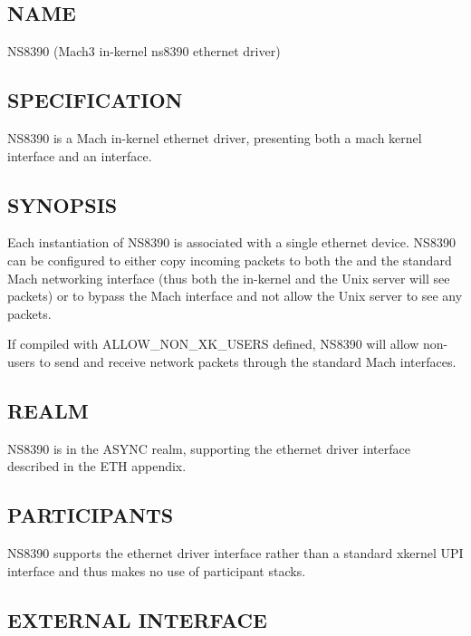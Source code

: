 %
%
%

\subsection*{NAME}

\noindent NS8390 (Mach3 in-kernel ns8390 ethernet driver)

\subsection*{SPECIFICATION}

\noindent

NS8390 is a Mach in-kernel ethernet driver, presenting both a
mach kernel interface and an \xk{} interface.


\subsection*{SYNOPSIS}

\noindent 

Each instantiation of NS8390 is associated with a single ethernet
device.  NS8390 can be configured to either copy incoming packets
to both the \xk{} and the standard Mach networking interface (thus
both the in-kernel \xk{} and the Unix server will see packets) or to
bypass the Mach interface and not allow the Unix server to see any
packets. 

If compiled with ALLOW\_NON\_XK\_USERS defined, NS8390 will 
allow non-\xk{} users to send and receive network packets through the
standard Mach interfaces.


\subsection*{REALM}

NS8390 is in the ASYNC realm, supporting the ethernet driver interface
described in the ETH appendix.


\subsection*{PARTICIPANTS}

NS8390 supports the ethernet driver interface rather than a standard
xkernel UPI interface and thus makes no use of participant stacks.


\subsection*{EXTERNAL INTERFACE}

